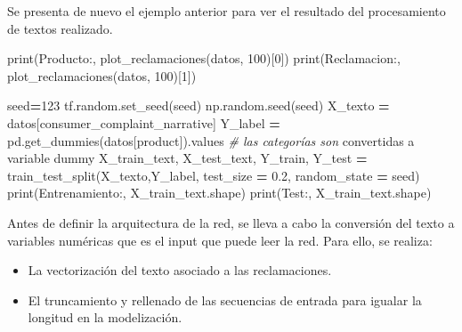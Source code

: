 \documentclass[
  a4paper,
  DIV=11,
  numbers=noendperiod]{scrreprt}
\newenvironment{Shaded}{\begin{snugshade}}{\end{snugshade}}
\newcommand{\BuiltInTok}[1]{#1}
\newcommand{\CommentTok}[1]{\textcolor[rgb]{0.56,0.35,0.01}{\textit{#1}}}
\newcommand{\DecValTok}[1]{\textcolor[rgb]{0.00,0.00,0.81}{#1}}
\newcommand{\FloatTok}[1]{\textcolor[rgb]{0.00,0.00,0.81}{#1}}
\newcommand{\NormalTok}[1]{#1}
\newcommand{\OperatorTok}[1]{\textcolor[rgb]{0.81,0.36,0.00}{\textbf{#1}}}
\newcommand{\StringTok}[1]{\textcolor[rgb]{0.31,0.60,0.02}{#1}}
\providecommand{\tightlist}{%
  \setlength{\itemsep}{0pt}\setlength{\parskip}{0pt}}\usepackage{longtable,booktabs,array}
\begin{document}
Se presenta de nuevo el ejemplo anterior para ver el resultado del
procesamiento de textos realizado.

\begin{Shaded}
\begin{Highlighting}[numbers=left,,]
\BuiltInTok{print}\NormalTok{(}\StringTok{\textquotesingle{}Producto:\textquotesingle{}}\NormalTok{, plot\_reclamaciones(datos, }\DecValTok{100}\NormalTok{)[}\DecValTok{0}\NormalTok{])}
\BuiltInTok{print}\NormalTok{(}\StringTok{\textquotesingle{}Reclamacion:\textquotesingle{}}\NormalTok{, plot\_reclamaciones(datos, }\DecValTok{100}\NormalTok{)[}\DecValTok{1}\NormalTok{])}
\end{Highlighting}
\end{Shaded}

\begin{Shaded}
\begin{Highlighting}[numbers=left,,]
\NormalTok{seed}\OperatorTok{=}\DecValTok{123}
\NormalTok{tf.random.set\_seed(seed)}
\NormalTok{np.random.seed(seed)}
\NormalTok{X\_texto }\OperatorTok{=}\NormalTok{ datos[}\StringTok{\textquotesingle{}consumer\_complaint\_narrative\textquotesingle{}}\NormalTok{]}
\NormalTok{Y\_label }\OperatorTok{=}\NormalTok{ pd.get\_dummies(datos[}\StringTok{\textquotesingle{}product\textquotesingle{}}\NormalTok{]).values }\CommentTok{\# las categorías son}
\NormalTok{convertidas a variable dummy}
\NormalTok{X\_train\_text, X\_test\_text, Y\_train, Y\_test }\OperatorTok{=}
\NormalTok{train\_test\_split(X\_texto,Y\_label, test\_size }\OperatorTok{=} \FloatTok{0.2}\NormalTok{, random\_state }\OperatorTok{=}\NormalTok{ seed)}
\BuiltInTok{print}\NormalTok{(}\StringTok{\textquotesingle{}Entrenamiento:\textquotesingle{}}\NormalTok{, X\_train\_text.shape)}
\BuiltInTok{print}\NormalTok{(}\StringTok{\textquotesingle{}Test:\textquotesingle{}}\NormalTok{, X\_train\_text.shape)}
\end{Highlighting}
\end{Shaded}

Antes de definir la arquitectura de la red, se lleva a cabo la
conversión del texto a variables numéricas que es el input que puede
leer la red. Para ello, se realiza:

\begin{itemize}
\tightlist
\item
  La vectorización del texto asociado a las reclamaciones.
\item
  El truncamiento y rellenado de las secuencias de entrada para igualar
  la longitud en la modelización.
\end{itemize}
\end{document}
